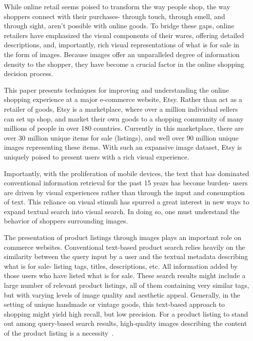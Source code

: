 \documentclass[conference,a4paper]{IEEEtran}
\begin{document}
While online retail seems poised to transform the way people shop, the way shoppers connect with their purchases- through touch, through smell, and through sight, aren't possible with online goods. To bridge these gaps, online retailers have emphasized the visual components of their wares, offering detailed descriptions, and, importantly, rich visual representations of what is for sale in the form of images. Because images offer an unparalleled degree of information density to the shopper, they have become a crucial factor in the online shopping decision process. 
 
This paper presents techniques for improving and understanding the online shopping experience at a major e-commerce website, Etsy. Rather than act as a retailer of goods, Etsy is a marketplace, where over a million individual sellers can set up shop, and market their own goods to a shopping community of many millions of people in over 180 countries. Currently in this marketplace, there are over 30 million unique items for sale (listings), and well over 90 million unique images representing these items. With such an expansive image dataset, Etsy is uniquely poised to present users with a rich visual experience. 
 
Importantly, with the proliferation of mobile devices, the text that has dominated conventional information retrieval for the past 15 years has become burden- users are driven by visual experiences rather than through the input and consumption of text. This reliance on visual stimuli has spurred a great interest in new ways to expand textual search into visual search. In doing so, one must understand the behavior of shoppers surrounding images.
 
The presentation of product listings through images plays
an important role on commerce websites. Conventional text-based  product search relies heavily on the similarity between 
the query input by a user and the textual metadata describing what is for sale- listing tags, titles, descriptions, etc. All information added by those users who have listed what is for sale. These search
results might include a large number of relevant product listings, all of them
containing very similar tags, but with varying levels of image quality
and aesthetic appeal. Generally, in the setting of unique handmade or vintage goods, this text-based approach to shopping might yield high recall, but low precision. For a product listing to stand out among query-based
search results, high-quality images describing the content of the
product listing is a necessity~\cite{wang2011aesthetics,obrador2009role}. 
 
\end{document}

